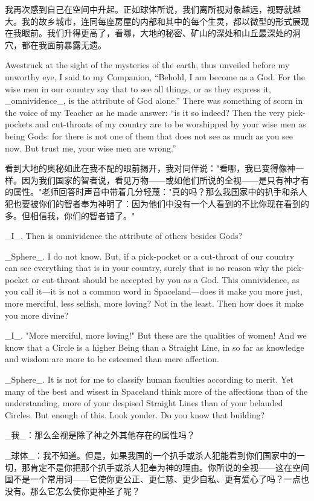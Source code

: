 \documentclass[12pt,UTF8]{ctexbook}
\begin{document}
我再次感到自己在空间中升起。正如球体所说，我们离所视对象越远，视野就越大。我的故乡城市，连同每座房屋的内部和其中的每个生灵，都以微型的形式展现在我眼前。我们升得更高了，看哪，大地的秘密、矿山的深处和山丘最深处的洞穴，都在我面前暴露无遗。

Awestruck at the sight of the mysteries of the earth, thus unveiled before my unworthy eye, I said to my Companion, ``Behold, I am become as a God. For the wise men in our country say that to see all things, or as they express it, \_omnividence\_, is the attribute of God alone.'' There was something of scorn in the voice of my Teacher as he made answer: ``is it so indeed? Then the very pick-pockets and cut-throats of my country are to be worshipped by your wise men as being Gods: for there is not one of them that does not see as much as you see now. But trust me, your wise men are wrong.''

看到大地的奥秘如此在我不配的眼前揭开，我对同伴说："看哪，我已变得像神一样。因为我们国家的智者说，看见万物——或如他们所说的全视——是只有神才有的属性。"老师回答时声音中带着几分轻蔑："真的吗？那么我国家中的扒手和杀人犯也要被你们的智者奉为神明了：因为他们中没有一个人看到的不比你现在看到的多。但相信我，你们的智者错了。"

\_I\_. Then is omnividence the attribute of others besides Gods?

\_Sphere\_. I do not know. But, if a pick-pocket or a cut-throat of our country can see everything that is in your country, surely that is no reason why the pick-pocket or cut-throat should be accepted by you as a God. This omnividence, as you call it---it is not a common word in Spaceland---does it make you more just, more merciful, less selfish, more loving? Not in the least. Then how does it make you more divine?

\_I\_. "More merciful, more loving!" But these are the qualities of women! And we know that a Circle is a higher Being than a Straight Line, in so far as knowledge and wisdom are more to be esteemed than mere affection.

\_Sphere\_. It is not for me to classify human faculties according to merit. Yet many of the best and wisest in Spaceland think more of the affections than of the understanding, more of your despised Straight Lines than of your belauded Circles. But enough of this. Look yonder. Do you know that building?

\_我\_：那么全视是除了神之外其他存在的属性吗？

\_球体\_：我不知道。但是，如果我国的一个扒手或杀人犯能看到你们国家中的一切，那肯定不是你把那个扒手或杀人犯奉为神的理由。你所说的全视——这在空间国不是一个常用词——它使你更公正、更仁慈、更少自私、更有爱心了吗？一点也没有。那么它怎么使你更神圣了呢？
\end{document}
